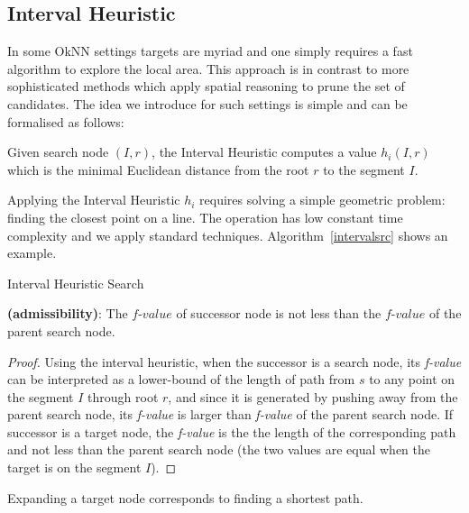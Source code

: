 \subsection{Interval Heuristic}
\label{sec::ih}

In some OkNN settings targets are myriad and one simply requires a fast algorithm to explore the local area. This approach is in contrast to more sophisticated methods which apply spatial reasoning
to prune the set of candidates. 
The idea we introduce for such settings is simple and can be formalised as follows:


\begin{definition}
  Given search node $(I, r)$, the Interval Heuristic computes a value $h_i(I, r)$ which
  is the minimal Euclidean distance from the root $r$ to the segment $I$.
\end{definition}

Applying the Interval Heuristic $h_i$ requires solving a simple geometric problem: finding the
closest point on a line. The operation has low constant time complexity and we apply
standard techniques. Algorithm~\ref{intervalsrc} shows an example.

\begin{algorithm}
  
  \caption{Interval Heuristic Search}
  \label{intervalsrc}
\end{algorithm}

\begin{theorem}{\textbf{(admissibility)}:}\label{nodesc}
  The $\textit{f-value}$ of successor node is not less than the $\textit{f-value}$ of the parent
  search node.
\end{theorem}

\begin{proof}
  Using the interval heuristic, when the successor is a search node, its \textit{f-value}
  can be interpreted as a lower-bound of the length of path from
  $s$ to any point on the segment $I$ through root $r$, and since it is generated by pushing
  away from the parent search node, its \textit{f-value} is larger than \textit{f-value}
  of the parent search node. If successor is a target node, the \textit{f-value} is the the length
  of the corresponding path and not less than the parent search node (the two values are equal 
  when the target is on the segment $I$).%
\end{proof}

\begin{corollary}
  Expanding a target node corresponds to finding a shortest path.
\end{corollary}


